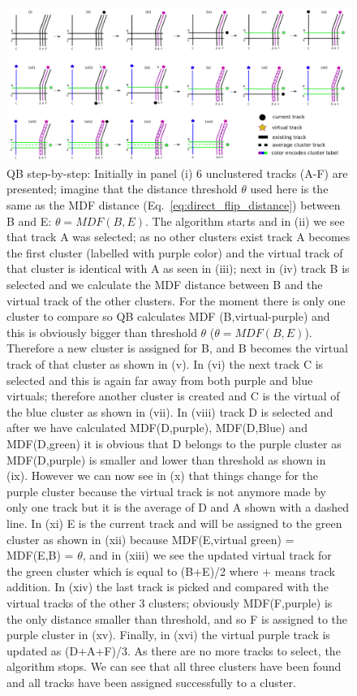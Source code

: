 \documentclass[journal]{IEEEtran}
\begin{document}
\begin{figure}[hb]
\centering\includegraphics[scale=0.25]{Fig_1_QB_algorithm}
\caption{QB step-by-step: Initially in panel (i) 6 unclustered tracks
(A-F) are presented; imagine that the distance threshold $\theta$ used here is
the same as the MDF distance (Eq.~\ref{eq:direct_flip_distance}) between B and
E: $\theta = MDF(B,E)$. The algorithm starts and in (ii) we see that track A
was selected; as no other clusters exist track A becomes the first cluster
(labelled with purple color) and the virtual track of that cluster is
identical with A as seen in (iii); next in (iv) track B is selected and we
calculate the MDF distance between B and the virtual track of the other
clusters. For the moment there is only one cluster to compare so QB calculates
MDF (B,virtual-purple) and this is obviously bigger than threshold $\theta$
($\theta = MDF(B,E)$).  Therefore a new cluster is assigned for B, and B
becomes the virtual track of that cluster as shown in (v). In (vi) the next
track C is selected and this is again far away from both purple and blue
virtuals; therefore another cluster is created and C is the virtual of the
blue cluster as shown in (vii).  In (viii) track D is selected and after we
have calculated MDF(D,purple), MDF(D,Blue) and MDF(D,green) it is obvious that
D belongs to the purple cluster as MDF(D,purple) is smaller and lower than
threshold as shown in (ix).  However we can now see in (x) that things change
for the purple cluster because the virtual track is not anymore made by only
one track but it is the average of D and A shown with a dashed line. In (xi) E
is the current track and will be assigned to the green cluster as shown in
(xii) because MDF(E,virtual green) = MDF(E,B) = $\theta$, and in (xiii) we see
the updated virtual track for the green cluster which is equal to (B+E)/2
where + means track addition. In (xiv) the last track is picked and compared
with the virtual tracks of the other 3 clusters; obviously MDF(F,purple) is
the only distance smaller than threshold, and so F is assigned to the purple
cluster in (xv).  Finally, in (xvi) the virtual purple track is updated as
(D+A+F)/3. As there are no more tracks to select, the algorithm stops. We can
see that all three clusters have been found and all tracks have been assigned
successfully to a cluster.}
\label{Fig:LSC_simple}
\end{figure}

\end{document}
